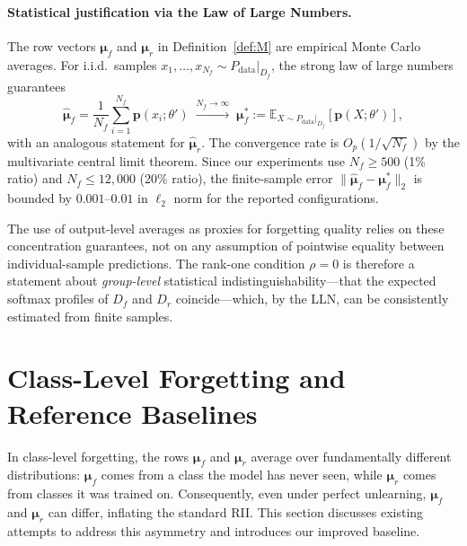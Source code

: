 \documentclass[journal]{IEEEtran}
\theoremstyle{definition}
\begin{document}
\paragraph{Statistical justification via the Law of Large Numbers.}
The row vectors $\boldsymbol{\mu}_f$ and $\boldsymbol{\mu}_r$ in Definition~\ref{def:M} are empirical Monte Carlo averages. For i.i.d.\ samples $x_1,\dots,x_{N_f} \sim P_{\mathrm{data}}|_{D_f}$, the strong law of large numbers guarantees
\begin{equation}
\hat{\boldsymbol{\mu}}_f = \frac{1}{N_f}\sum_{i=1}^{N_f} \mathbf{p}(x_i;\theta')
\;\xrightarrow{N_f\to\infty}\;
\boldsymbol{\mu}_f^* := \mathbb{E}_{X\sim P_{\mathrm{data}}|_{D_f}}[\mathbf{p}(X;\theta')],
\end{equation}
with an analogous statement for $\hat{\boldsymbol{\mu}}_r$. The convergence rate is $O_p(1/\sqrt{N_f})$ by the multivariate central limit theorem. Since our experiments use $N_f \ge 500$ (1\% ratio) and $N_f \le 12{,}000$ (20\% ratio), the finite-sample error $\|\hat{\boldsymbol{\mu}}_f - \boldsymbol{\mu}_f^*\|_2$ is bounded by $0.001$--$0.01$ in $\ell_2$ norm for the reported configurations.

The use of output-level averages as proxies for forgetting quality relies on these concentration guarantees, not on any assumption of pointwise equality between individual-sample predictions. The rank-one condition $\rho = 0$ is therefore a statement about \emph{group-level} statistical indistinguishability---that the expected softmax profiles of $D_f$ and $D_r$ coincide---which, by the LLN, can be consistently estimated from finite samples.

\section{Class-Level Forgetting and Reference Baselines}
\label{sec:class_baselines}

In class-level forgetting, the rows $\boldsymbol{\mu}_f$ and $\boldsymbol{\mu}_r$ average over fundamentally different distributions: $\boldsymbol{\mu}_f$ comes from a class the model has never seen, while $\boldsymbol{\mu}_r$ comes from classes it was trained on. Consequently, even under perfect unlearning, $\boldsymbol{\mu}_f$ and $\boldsymbol{\mu}_r$ can differ, inflating the standard RII. This section discusses existing attempts to address this asymmetry and introduces our improved baseline.
\end{document}
